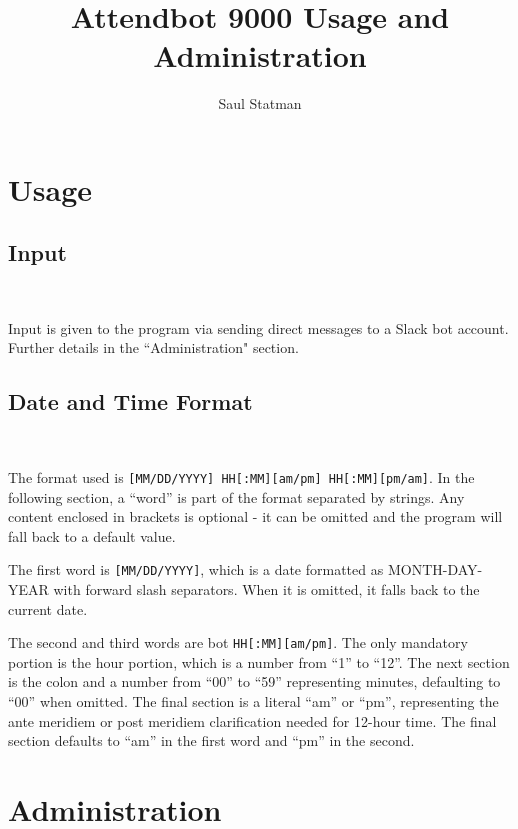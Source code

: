 \documentclass{article}
\begin{document}
\title{Attendbot 9000 Usage and Administration}

\author{Saul Statman}

\maketitle

\section{Usage}

\subsection{Input}

\

Input is given to the program via sending direct messages to a Slack bot account. Further details in the ``Administration" section.

\subsection{Date and Time Format}

\

The format used is \texttt{[MM/DD/YYYY] HH[:MM][am/pm] HH[:MM][pm/am]}. In the following section, a ``word'' is part of the format separated by strings. Any content enclosed in brackets is optional - it can be omitted and the program will fall back to a default value.

The first word is \texttt{[MM/DD/YYYY]}, which is a date formatted as MONTH-DAY-YEAR with forward slash separators. When it is omitted, it falls back to the current date.

The second and third words are bot \texttt{HH[:MM][am/pm]}. The only mandatory portion is the hour portion, which is a number from ``1'' to ``12''. The next section is the colon and a number from ``00'' to ``59'' representing minutes, defaulting to ``00'' when omitted. The final section is a literal ``am'' or ``pm'', representing the ante meridiem or post meridiem clarification needed for 12-hour time. The final section defaults to ``am'' in the first word and ``pm'' in the second.

\section{Administration}

\
\end{document}
